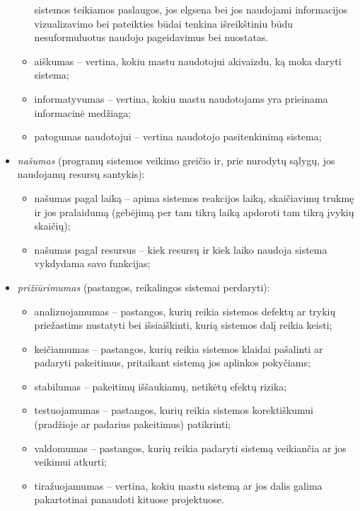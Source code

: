 \begin{itemize}
\begin{itemize}
        sistemos teikiamos paslaugos, jos elgsena bei jos naudojami
        informacijos vizualizavimo bei pateikties būdai tenkina 
        išreikštiniu būdu nesuformuluotus naudojo pageidavimus bei
        nuostatas.
      \item aiškumas  – vertina, kokiu mastu naudotojui
        akivaizdu, ką moka daryti sistema;
      \item informatyvumas  – vertina, kokiu mastu
        naudotojams yra prieinama informacinė medžiaga;
      \item patogumas naudotojui  – vertina
        naudotojo pasitenkinimą sistema;
    \end{itemize}
  \item \emph{našumas}  (programų sistemos veikimo greičio
    ir, prie nurodytų sąlygų, jos naudojamų resursų santykis):
    \begin{itemize}
      \item našumas pagal laiką  – apima sistemos
        reakcijos laiką, skaičiavimų trukmę ir jos pralaidumą
        (gebėjimą per tam tikrą laiką apdoroti tam tikrą įvykių skaičių);
      \item našumas pagal resursus  – kiek
        resursų ir kiek laiko naudoja sistema vykdydama savo funkcijas;
    \end{itemize}
  \item \emph{prižiūrimumas}  (pastangos, reikalingos
    sistemai perdaryti):
    \begin{itemize}
      \item analizuojamumas  – pastangos, kurių
        reikia sistemos defektų ar trykių priežastims nustatyti bei
        išsiaiškinti, kurią sistemos dalį reikia keisti;
      \item keičiamumas  – pastangos, kurių reikia 
        sistemos klaidai pašalinti ar padaryti pakeitimus, pritaikant
        sistemą jos aplinkos pokyčiams;
      \item stabilumas  – pakeitimų iššaukiamų, netikėtų
        efektų rizika;
      \item testuojamumas  – pastangos, kurių reikia
        sistemos korektiškumui (pradžioje ar padarius pakeitimus)
        patikrinti;
      \item valdomumas  – pastangos, kurių reikia
        padaryti sistemą veikiančia ar jos veikimui atkurti;
      \item tiražuojamumas  – vertina, kokiu mastu sistemą
        ar jos dalis galima pakartotinai panaudoti kituose projektuose.
    \end{itemize}
\end{itemize}

